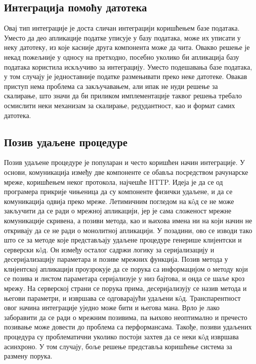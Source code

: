 \documentclass[12pt,oneside]{memoir}
\begin{document}
\subsection{Интеграција помоћу датотека}
Овај тип интеграције је доста сличан интеграцији коришћењем базе података. Уместо да део апликације податке уписује у базу података, може их уписати у неку датотеку, из које касније друга компонента може да чита. Овакво решење је некад пожељније у односу на претходно, посебно уколико би апликација базу података користила искључиво за интеграцију. Уместо подешавања базе података, у том случају је једноставније податке размењивати преко неке датотеке. Овакав приступ нема проблема са закључавањем, али ипак не нуди решење за скалирање, што значи да би приликом имплементације таквог решења требало осмислити неки механизам за скалирање, редудантност, као и формат самих датотека.

\subsection{Позив удаљене процедуре}
Позив удаљене процедуре је популаран и често коришћен начин интеграције. У основи, комуникација између две компоненте се обавља посредством рачунарске мреже, коришћењем неког протокола, најчешће HTTP. Идеја је да се од програмера прикрије чињеница да су компоненте физички удаљене, и да се комуникација одвија преко мреже. Летимичним погледом на кôд се не може закључити да се ради о мрежној апликацији, јер је сама сложеност мрежне комуникације скривена, а позиви метода, као и њихова имена ни на који начин не откривају да се не ради о монолитној апликацији. У позадини, ово се изводи тако што се за методе које представљају удаљене процедуре генерише клијентски и серверски кôд. Он између осталог садржи логику за серијализацију и десеријализацију параметара и позиве мрежних функција. Позив метода у клијентској апликацији проузрокује да се порука са информацијом о методу који се позива и листом параметара серијализује у низ бајтова, и онда се шаље кроз мрежу. На серверској страни се порука прима, десеријализују се назив метода и његови параметри, и извршава се одговарајући удаљени кôд. Транспарентност овог начина интеграције уједно може бити и његова мана. Врло је лако заборавити да се ради о мрежним позивима, па њихово неоптимално и пречесто позивање може довести до проблема са перформансама. Такође, позиви удаљених процедура су проблематични уколико постоји захтев да се неки кôд извршава асинхроно. У том случају, боље решење представља коришћење система за размену порука.
\end{document}
